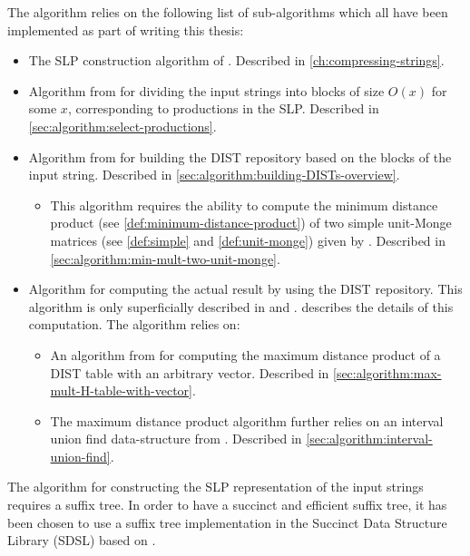 \documentclass[twoside,11pt,openright]{report}
\begin{document}
The algorithm relies on the following list of sub-algorithms which all have been implemented as part of writing this thesis:
\begin{itemize}
  \item The SLP construction algorithm of \cite{Rytter2003211}. Described in \cref{ch:compressing-strings}.
  \item Algorithm from \cite{DBLP:journals/corr/abs-1004-1194} for dividing the input strings into blocks of size $O(x)$ for some $x$, corresponding to productions in the SLP. Described in \cref{sec:algorithm:select-productions}.
  \item Algorithm from \cite{DBLP:journals/corr/abs-1004-1194} for building the DIST repository based on the blocks of the input string. Described in \cref{sec:algorithm:building-DISTs-overview}.
    \begin{itemize}
      \item This algorithm requires the ability to compute the minimum distance product (see \cref{def:minimum-distance-product}) of two simple unit-Monge matrices (see \cref{def:simple} and \cref{def:unit-monge}) given by \cite{Tiskin:2010:FDM:1873601.1873704}. Described in \cref{sec:algorithm:min-mult-two-unit-monge}.
    \end{itemize}
  \item Algorithm for computing the actual result by using the DIST repository. This algorithm is only superficially described in \cite{Gawrychowski:2012:FAC:2422024.2422048} and \cite{DBLP:journals/corr/abs-0707-3619}.  describes the details of this computation. The algorithm relies on:
    \begin{itemize}
      \item An algorithm from \cite{Gawrychowski:2012:FAC:2422024.2422048} for computing the maximum distance product of a DIST table with an arbitrary vector. Described in \cref{sec:algorithm:max-mult-H-table-with-vector}.
      \item The maximum distance product algorithm further relies on an interval union find data-structure from \cite{Itai06lineartime}. Described in \cref{sec:algorithm:interval-union-find}.
    \end{itemize}
\end{itemize}
The algorithm for constructing the SLP representation of the input strings requires a suffix tree. In order to have a succinct and efficient suffix tree, it has been chosen to use a suffix tree implementation in the Succinct Data Structure Library (SDSL) \cite{SDSL} based on \cite{OHL:FIS:GOG:2010}.
\end{document}
